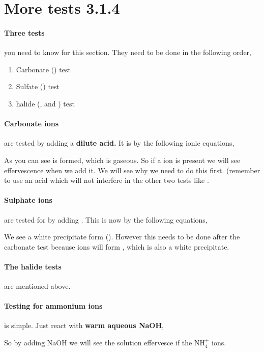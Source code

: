 \section{More tests 3.1.4}

	\paragraph{Three tests} you need to know for this section. They need to be done in the following order,
	\begin{enumerate}
		\item Carbonate () test
		\item Sulfate () test
		\item halide (, and ) test
	\end{enumerate}
	
	\paragraph{Carbonate ions} are tested by adding a \textbf{dilute acid.} It is by the following ionic equations,
	\begin{center}
	\end{center}
	As you can see  is formed, which is gaseous. So if a  ion is present we will see effervescence when we add it.
	We will see why we need to do this first.
	(remember to use an acid which will not interfere in the other two tests like .
	
	\paragraph{Sulphate ions} are tested for by adding \textbf{}. This is now by the following equations,
	\begin{center}
	\end{center}
	We see a white precipitate form ().
	However this needs to be done after the carbonate test because  ions will form , which is also a white precipitate.
	
	\paragraph{The halide tests} are mentioned above.
	
	\paragraph{Testing for ammonium ions} is simple. Just react with \textbf{warm aqueous NaOH},
	\begin{center}
	\end{center}
	So by adding NaOH we will see the solution effervesce if the NH$_4^+$ ions.
